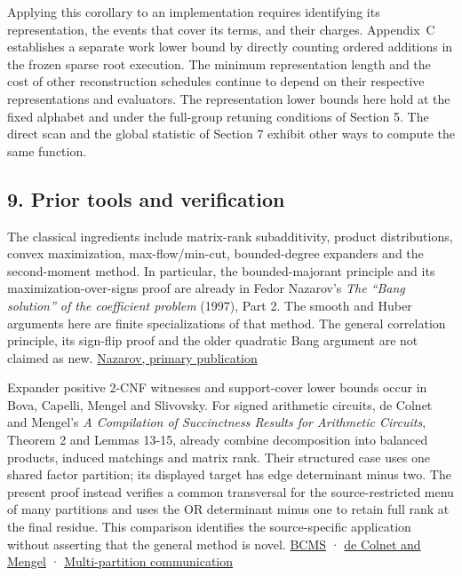 \documentclass[
  11pt,
]{article}
\begin{document}
Applying this corollary to an implementation requires identifying its
representation, the events that cover its terms, and their charges.
Appendix~C establishes a separate work lower bound by directly counting
ordered additions in the frozen sparse root execution. The minimum
representation length and the cost of other reconstruction schedules
continue to depend on their respective representations and evaluators.
The representation lower bounds here hold at the fixed alphabet and
under the full-group retuning conditions of Section 5. The direct scan
and the global statistic of Section 7 exhibit other ways to compute
the same function.

\subsection{9. Prior tools and
verification}\label{prior-tools-and-verification}

The classical ingredients include matrix-rank subadditivity, product
distributions, convex maximization, max-flow/min-cut, bounded-degree
expanders and the second-moment method. In particular, the
bounded-majorant principle and its maximization-over-signs proof are
already in Fedor Nazarov's \emph{The ``Bang solution'' of the
coefficient problem} (1997), Part 2. The smooth and Huber arguments here
are finite specializations of that method. The general correlation
principle, its sign-flip proof and the older quadratic Bang argument are
not claimed as new. \href{https://www.mathnet.ru/eng/aa774}{Nazarov,
primary publication}

Expander positive 2-CNF witnesses and support-cover lower bounds occur
in Bova, Capelli, Mengel and Slivovsky. For signed arithmetic circuits,
de Colnet and Mengel's \emph{A Compilation of Succinctness Results for
Arithmetic Circuits}, Theorem 2 and Lemmas 13-15, already combine
decomposition into balanced products, induced matchings and matrix rank.
Their structured case uses one shared factor partition; its displayed
target has edge determinant minus two. The present proof instead
verifies a common transversal for the source-restricted menu of many
partitions and uses the OR determinant minus one to retain full rank at
the final residue. This comparison identifies the source-specific
application without asserting that the general method is novel.
\href{https://arxiv.org/abs/1411.1995}{BCMS} ·
\href{https://arxiv.org/abs/2110.13014}{de Colnet and Mengel} ·
\href{https://ijcai.org/proceedings/2016/147}{Multi-partition
communication}
\end{document}

